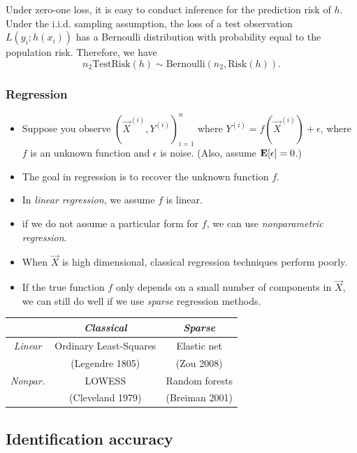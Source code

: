 
Under zero-one loss, it is easy to conduct inference for the
prediction risk of $h$.  Under the i.i.d. sampling assumption, the
loss of a test observation $L(y_i; h(x_i))$ has a Bernoulli
distribution with probability equal to the population risk.  Therefore,
we have
\[
n_2 \text{TestRisk}(h) \sim \text{Bernoulli}(n_2, \text{Risk}(h)).
\]


\subsubsection{Regression}

\begin{itemize}
\item Suppose you observe $(\vec{X}^{(i)}, Y^{(i)})_{i=1}^n$ where $Y^{(i)} = f(\vec{X}^{(i)}) + \epsilon$, where $f$ is an unknown function and $\epsilon$ is noise.  (Also, assume $\textbf{E}[\epsilon] = 0$.)
\item The goal in regression is to recover the unknown function $f$.
\item In \emph{linear regression}, we assume $f$ is linear. 
\item if we do not assume a particular form for $f$, we can use \emph{nonparametric regression}.
\end{itemize}

\begin{itemize}
\item When $\vec{X}$ is high dimensional, classical regression techniques perform poorly.
\item If the true function $f$ only depends on a small number of components in $\vec{X}$, we can still do well if we use \emph{sparse} regression methods.
\end{itemize}
\begin{center}
\begin{tabular}{c|c|c|}
 & \emph{Classical} & \emph{Sparse} \\ \hline
 \emph{Linear} & Ordinary Least-Squares  & Elastic net \\ 
  & (Legendre 1805) & (Zou 2008)  \\\hline
 \emph{Nonpar.} & LOWESS  & Random forests  \\ 
   & (Cleveland 1979) & (Breiman 2001)  \\\hline
\end{tabular}
\end{center}

\subsection{Identification accuracy}\label{sec:ident_risk}

